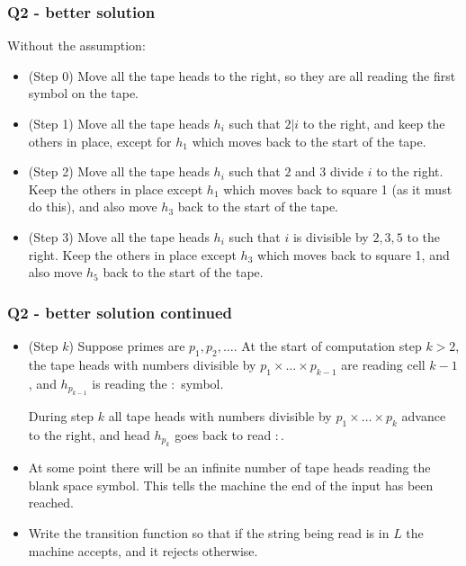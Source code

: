 \documentclass[handout]{beamer}
\begin{document}
\begin{frame}
\frametitle{Q2 - better solution}
Without the assumption:
\begin{itemize}
\item (Step 0) Move all the tape heads to the right, so they are all reading the first symbol on the tape.
\item (Step 1) Move all the tape heads $h_i$ such that $2|i$ to the right, and keep the others in place, except for $h_1$ which moves back to the start of the tape.
\item (Step 2) Move all the tape heads $h_i$ such that $2$ and $3$ divide $i$ to the right. Keep the others in place except $h_1$ which moves back to square 1 (as it must do this), and also move $h_3$ back to the start of the tape.
\item (Step 3) Move all the tape heads $h_i$ such that $i$ is divisible by $2,3,5$ to the right. Keep the others in place except $h_3$ which moves back to square 1, and also move $h_5$ back to the start of the tape.
\end{itemize}
\end{frame}

\begin{frame}
\frametitle{Q2 - better solution continued}
\begin{itemize}
\item (Step $k$) Suppose primes are $p_1,p_2,\ldots$. At the start of computation step $k>2$, the tape heads with numbers divisible by $p_1\times\ldots \times p_{k-1}$ are reading cell $k-1$, and $h_{p_{k-1}}$ is reading the $:$ symbol.  

During step $k$ all tape heads with numbers divisible by $p_1\times\ldots \times p_{k}$ advance to the right, and head $h_{p_k}$ goes back to read $:$.
\item At some point there will be an infinite number of tape heads reading the blank space symbol. This tells the machine the end of the input has been reached.
\item Write the transition function so that if the string being read is in $L$ the machine accepts, and it rejects otherwise.
\end{itemize}
\end{frame}
\end{document}
